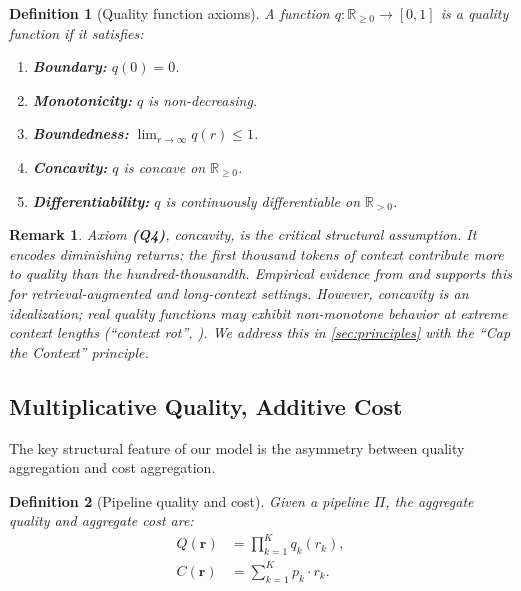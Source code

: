 \documentclass[11pt, a4paper, logo, copyright]{googledeepmind}
\newtheorem{definition}{Definition}[section]
\newtheorem*{remark}{Remark}
\begin{document}
\begin{definition}[Quality function axioms]\label{def:quality-axioms}
A function $q: \mathbb{R}_{\geq 0} \to [0,1]$ is a \emph{quality function} if it satisfies:
\begin{enumerate}[label=\textbf{(Q\arabic*)}, nosep]
    \item \textbf{Boundary:} $q(0) = 0$.
    \item \textbf{Monotonicity:} $q$ is non-decreasing.
    \item \textbf{Boundedness:} $\lim_{r \to \infty} q(r) \leq 1$.
    \item \textbf{Concavity:} $q$ is concave on $\mathbb{R}_{\geq 0}$.
    \item \textbf{Differentiability:} $q$ is continuously differentiable on $\mathbb{R}_{> 0}$.
\end{enumerate}
\end{definition}

\begin{remark}
Axiom \textbf{(Q4)}, concavity, is the critical structural assumption. It encodes diminishing returns: the first thousand tokens of context contribute more to quality than the hundred-thousandth. Empirical evidence from \citet{gao2025context} and \citet{liu2024lost} supports this for retrieval-augmented and long-context settings. However, concavity is an idealization; real quality functions may exhibit non-monotone behavior at extreme context lengths (``context rot'', \citealp{chroma2025rot}). We address this in \cref{sec:principles} with the ``Cap the Context'' principle.
\end{remark}

\subsection{Multiplicative Quality, Additive Cost}

The key structural feature of our model is the asymmetry between quality aggregation and cost aggregation.

\begin{definition}[Pipeline quality and cost]\label{def:quality-cost}
Given a pipeline $\Pi$, the \emph{aggregate quality} and \emph{aggregate cost} are:
\begin{align}
    Q(\mathbf{r}) &= \prod_{k=1}^{K} q_k(r_k), \label{eq:mult-quality} \\
    C(\mathbf{r}) &= \sum_{k=1}^{K} p_k \cdot r_k. \label{eq:add-cost}
\end{align}
\end{definition}
\end{document}
